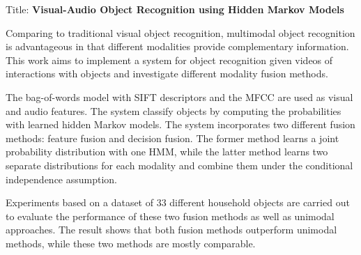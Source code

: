 \documentclass[a4paper,11pt]{article} %
\begin{document}
Title: \textbf{Visual-Audio Object Recognition using Hidden Markov Models}

Comparing to traditional visual object recognition, multimodal object recognition is advantageous in that different modalities provide complementary information. This work aims to implement a system for object recognition given videos of interactions with objects and investigate different modality fusion methods.

The bag-of-words model with SIFT descriptors and the MFCC are used as visual and audio features. The system classify objects by computing the probabilities with learned hidden Markov models. The system incorporates two different fusion methods: feature fusion and decision fusion. The former method learns a joint probability distribution with one HMM, while the latter method learns two separate distributions for each modality and combine them under the conditional independence assumption.

Experiments based on a dataset of 33 different household objects are carried out to evaluate the performance of these two fusion methods as well as unimodal approaches. The result shows that both fusion methods outperform unimodal methods, while these two methods are mostly comparable. 
\fi
\end{document}
